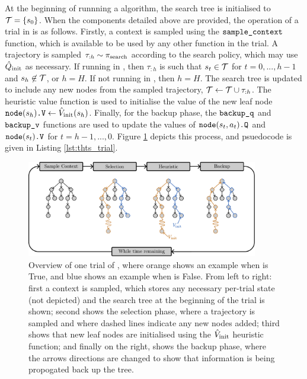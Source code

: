         At the beginning of runnning a \thtspp\ewe algorithm, the search tree is initialised to $\mathcal{T}=\{s_0\}$. When the components detailed above are provided, the operation of a trial in \thtspp\ewe is as follows. Firstly, a context is sampled using the ${\textnormal{\texttt{sample\_context}}}$ function, which is available to be used by any other function in the trial. A trajectory is sampled $\tau_{:h}\sim{\pi_{\textnormal{search}}}$ according to the search policy, which may use ${\hat{Q}_{\textnormal{init}}}$ as necessary. If running in \mctsmode, then $\tau_{:h}$ is such that $s_t\in\mathcal{T}$ for $t=0,...,h-1$ and $s_h\not\in\mathcal{T}$, or $h=H$. If not running in \mctsmode, then $h=H$. The search tree is updated to include any new nodes from the sampled trajectory, $\mathcal{T}\leftarrow\mathcal{T}\cup\tau_{:h}$. The heuristic value function is used to initialise the value of the new leaf node ${{\textnormal{\texttt{node}}}(s_h)\textnormal{\texttt{.V}}}\leftarrow {\hat{V}_{\textnormal{init}}}(s_h)$. Finally, for the backup phase, the ${\textnormal{\texttt{backup\_q}}}$ and ${\textnormal{\texttt{backup\_v}}}$ functions are used to update the values of ${{\textnormal{\texttt{node}}}(s_t,a_t)\textnormal{\texttt{.Q}}}$ and ${{\textnormal{\texttt{node}}}(s_t)\textnormal{\texttt{.V}}}$ for $t=h-1,...,0$. Figure \ref{fig:thts} depicts this process, and psuedocode is given in Listing \ref{lst:thts_trial}.

        \begin{figure}
            \centering\includegraphics[width=0.9\textwidth]{figures/ch2/mcts_diagram_draft.pdf} 
            \caption[Overview of one trial of \thtspp.]{Overview of one trial of \thtspp, where orange shows an example when \mctsmode\ewe is True, and blue shows an example when \mctsmode\ewe is False. From left to right: first a context is sampled, which stores any necessary per-trial state (not depicted) and the search tree at the beginning of the trial is shown; second shows the selection phase, where a trajectory is sampled and where dashed lines indicate any new nodes added; third shows that new leaf nodes are initialised using the ${\hat{V}_{\textnormal{init}}}$ heuristic function; and finally on the right, shows the backup phase, where the arrows directions are changed to show that information is being propogated back up the tree.  }
            \label{fig:thts}
        \end{figure}
        
